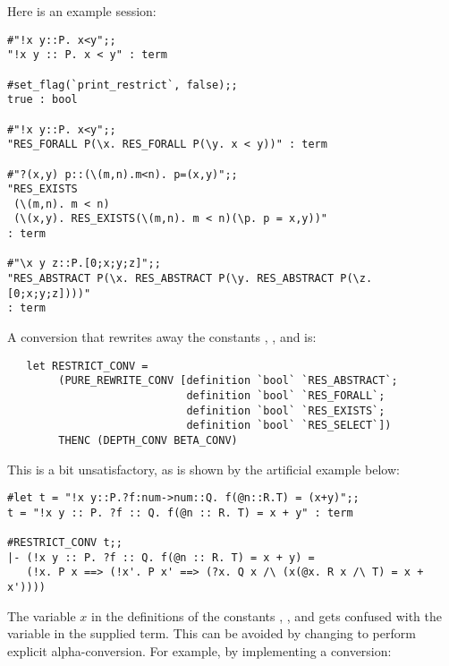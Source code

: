 Here is an example session:

\setcounter{sessioncount}{1}
\begin{session}\begin{verbatim}
#"!x y::P. x<y";;
"!x y :: P. x < y" : term

#set_flag(`print_restrict`, false);;
true : bool

#"!x y::P. x<y";;
"RES_FORALL P(\x. RES_FORALL P(\y. x < y))" : term

#"?(x,y) p::(\(m,n).m<n). p=(x,y)";;
"RES_EXISTS
 (\(m,n). m < n)
 (\(x,y). RES_EXISTS(\(m,n). m < n)(\p. p = x,y))"
: term

#"\x y z::P.[0;x;y;z]";;
"RES_ABSTRACT P(\x. RES_ABSTRACT P(\y. RES_ABSTRACT P(\z. [0;x;y;z])))"
: term
\end{verbatim}\end{session}

A conversion that rewrites away the constants ,
,  and  is:

\begin{hol}\begin{verbatim}
   let RESTRICT_CONV =
        (PURE_REWRITE_CONV [definition `bool` `RES_ABSTRACT`;
                            definition `bool` `RES_FORALL`;
                            definition `bool` `RES_EXISTS`;
                            definition `bool` `RES_SELECT`])
        THENC (DEPTH_CONV BETA_CONV)
\end{verbatim}\end{hol}

\noindent This is a bit unsatisfactory, as is shown by the artificial
example below:

\setcounter{sessioncount}{1}
\begin{session}\begin{verbatim}
#let t = "!x y::P.?f:num->num::Q. f(@n::R.T) = (x+y)";;
t = "!x y :: P. ?f :: Q. f(@n :: R. T) = x + y" : term

#RESTRICT_CONV t;;
|- (!x y :: P. ?f :: Q. f(@n :: R. T) = x + y) =
   (!x. P x ==> (!x'. P x' ==> (?x. Q x /\ (x(@x. R x /\ T) = x + x'))))
\end{verbatim}\end{session}

The variable $x$ in the definitions of the constants
, ,  and
 gets confused with the variable in the supplied term.
This can be avoided by changing  to perform
explicit alpha-conversion. For example, by implementing a conversion:

